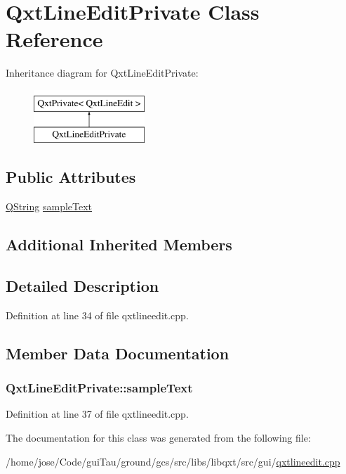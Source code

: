 \hypertarget{class_qxt_line_edit_private}{\section{Qxt\-Line\-Edit\-Private Class Reference}
\label{class_qxt_line_edit_private}
}
Inheritance diagram for Qxt\-Line\-Edit\-Private\-:\begin{figure}[H]
\begin{center}
\leavevmode
\includegraphics[height=2.000000cm]{class_qxt_line_edit_private}
\end{center}
\end{figure}
\subsection*{Public Attributes}
\begin{DoxyCompactItemize}
\item 
\hyperlink{group___u_a_v_objects_plugin_gab9d252f49c333c94a72f97ce3105a32d}{Q\-String} \hyperlink{class_qxt_line_edit_private_ad3b8256d2f3406e42f7463fb76003839}{sample\-Text}
\end{DoxyCompactItemize}
\subsection*{Additional Inherited Members}


\subsection{Detailed Description}


Definition at line 34 of file qxtlineedit.\-cpp.



\subsection{Member Data Documentation}
\hypertarget{class_qxt_line_edit_private_ad3b8256d2f3406e42f7463fb76003839}{
\subsubsection[{sample\-Text}]{ Qxt\-Line\-Edit\-Private\-::sample\-Text}}\label{class_qxt_line_edit_private_ad3b8256d2f3406e42f7463fb76003839}


Definition at line 37 of file qxtlineedit.\-cpp.



The documentation for this class was generated from the following file\-:\begin{DoxyCompactItemize}
\item 
/home/jose/\-Code/gui\-Tau/ground/gcs/src/libs/libqxt/src/gui/\hyperlink{qxtlineedit_8cpp}{qxtlineedit.\-cpp}\end{DoxyCompactItemize}
